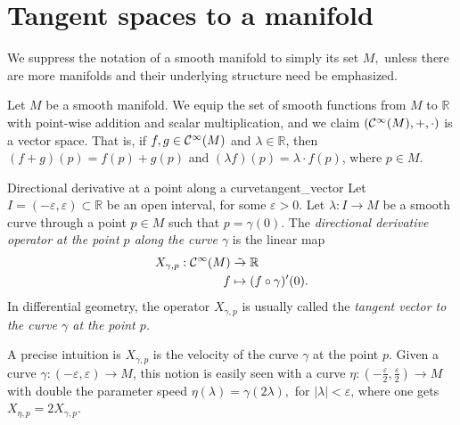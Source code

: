 \section{Tangent spaces to a manifold}

We suppress the notation of a smooth manifold  to simply its set \(M,\) unless there are more manifolds and their underlying structure need be emphasized.

Let \(M\) be a smooth manifold. We equip the set of smooth functions from \(M\) to \(\mathbb{R}\) with point-wise addition and scalar multiplication, and we claim \((\mathcal{C}^\infty(M), +, \cdot)\) is a vector space. That is, if \(f, g \in \mathcal{C}^\infty(M)\) and \(\lambda \in \mathbb{R}\), then \((f+g)(p) = f(p) + g(p)\) and \((\lambda f)(p) = \lambda\cdot f(p)\), where \(p \in M\).

\begin{definition}{Directional derivative at a point along a curve}{tangent_vector}
    Let \(I = (-\varepsilon, \varepsilon) \subset \mathbb{R}\) be an open interval, for some \(\varepsilon > 0\). Let \(\lambda : I \to M\) be a smooth curve through a point \(p \in M\) such that \(p = \gamma(0)\). The \emph{directional derivative operator at the point \(p\) along the curve \(\gamma\)} is the linear map
    \begin{align*}
        X_{\gamma, p} : \mathcal{C}^\infty(M) &\mathrel{\tilde{\to}} \mathbb{R}\\
                                            f &\mapsto (f \circ \gamma)'(0).
    \end{align*}
    In differential geometry, the operator \(X_{\gamma, p}\) is usually called the \emph{tangent vector to the curve \(\gamma\) at the point \(p\).}
\end{definition}

A precise intuition is \(X_{\gamma, p}\) is the velocity of the curve \(\gamma\) at the point \(p\). Given a curve \(\gamma : (-\varepsilon, \varepsilon) \to M\), this notion is easily seen with a curve \(\eta : \left(-\frac{\varepsilon}2, \frac{\varepsilon}{2}\right) \to M\) with double the parameter speed \(\eta(\lambda) = \gamma(2 \lambda),\) for \(|\lambda| < \varepsilon\), where one gets \(X_{\eta, p} = 2 X_{\gamma, p}\).

